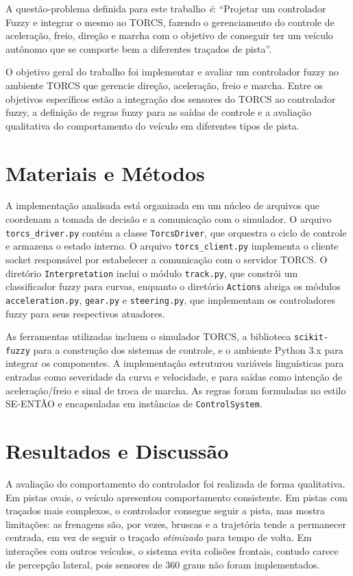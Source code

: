 \documentclass[12pt]{article}
\begin{document}
A quest\~ao-problema definida para este trabalho \emph{\'e}: ``Projetar um controlador Fuzzy e integrar o mesmo ao TORCS, fazendo o gerenciamento do controle de acelera\c{c}\~ao, freio, dire\c{c}\~ao e marcha com o objetivo de conseguir ter um ve\'iculo aut\^onomo que se comporte bem a diferentes tra\c{c}ados de pista''.

O objetivo geral do trabalho foi implementar e avaliar um controlador fuzzy no ambiente TORCS que gerencie dire\c{c}\~ao, acelera\c{c}\~ao, freio e marcha. Entre os objetivos espec\'ificos est\~ao a integra\c{c}\~ao dos sensores do TORCS ao controlador fuzzy, a defini\c{c}\~ao de regras fuzzy para as sa\'idas de controle e a avalia\c{c}\~ao qualitativa do comportamento do ve\'iculo em diferentes tipos de pista.

\section{Materiais e M\'etodos}
A implementa\c{c}\~ao analisada est\'a organizada em um n\'ucleo de arquivos que coordenam a tomada de decis\~ao e a comunica\c{c}\~ao com o simulador. O arquivo \texttt{torcs\_driver.py} cont\'em a classe \texttt{TorcsDriver}, que orquestra o ciclo de controle e armazena o estado interno. O arquivo \texttt{torcs\_client.py} implementa o cliente socket respons\'avel por estabelecer a comunica\c{c}\~ao com o servidor TORCS. O diret\'orio \texttt{Interpretation} inclui o m\'odulo \texttt{track.py}, que constr\'oi um classificador fuzzy para curvas, enquanto o diret\'orio \texttt{Actions} abriga os m\'odulos \texttt{acceleration.py}, \texttt{gear.py} e \texttt{steering.py}, que implementam os controladores fuzzy para seus respectivos atuadores.

As ferramentas utilizadas incluem o simulador TORCS, a biblioteca \texttt{scikit-fuzzy} \cite{skfuzzy} para a constru\c{c}\~ao dos sistemas de controle, e o ambiente Python 3.x para integrar os componentes. A implementa\c{c}\~ao estruturou vari\'aveis lingu\'isticas para entradas como severidade da curva e velocidade, e para sa\'idas como inten\c{c}\~ao de acelera\c{c}\~ao/freio e sinal de troca de marcha. As regras foram formuladas no estilo SE-ENT\~AO e encapsuladas em inst\^ancias de \texttt{ControlSystem}.

\section{Resultados e Discuss\~ao}
A avalia\c{c}\~ao do comportamento do controlador foi realizada de forma qualitativa. Em pistas ovais, o ve\'iculo apresentou comportamento consistente. Em pistas com tra\c{c}ados mais complexos, o controlador consegue seguir a pista, mas mostra limita\c{c}\~oes: as frenagens s\~ao, por vezes, bruscas e a trajet\'oria tende a permanecer centrada, em vez de seguir o tra\c{c}ado \emph{otimizado} para tempo de volta. Em intera\c{c}\~oes com outros ve\'iculos, o sistema evita colis\~oes frontais, contudo carece de percep\c{c}\~ao lateral, pois sensores de 360 graus n\~ao foram implementados.
\end{document}
